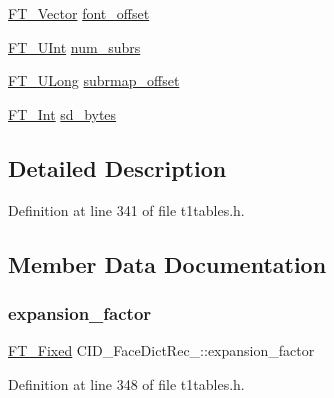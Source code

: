 \begin{DoxyCompactItemize}
\item 
\mbox{\hyperlink{ftimage_8h_ab158b5a7e422acb1968af95db786d018}{F\+T\+\_\+\+Vector}} \mbox{\hyperlink{struct_c_i_d___face_dict_rec___aa62daa8d45ed4a817f1207cbd452d61e}{font\+\_\+offset}}
\item 
\mbox{\hyperlink{fttypes_8h_abcb8db4dbf35d2b55a9e8c7b0926dc52}{F\+T\+\_\+\+U\+Int}} \mbox{\hyperlink{struct_c_i_d___face_dict_rec___a611c406c8d7cd2e37d077070f4bb3ebe}{num\+\_\+subrs}}
\item 
\mbox{\hyperlink{fttypes_8h_a4fac88bdba78eb76b505efa6e4fbf3f5}{F\+T\+\_\+\+U\+Long}} \mbox{\hyperlink{struct_c_i_d___face_dict_rec___a45d58111727af70018289e7c5b64ba8c}{subrmap\+\_\+offset}}
\item 
\mbox{\hyperlink{fttypes_8h_af90e5fb0d07e21be9fe6faa33f02484c}{F\+T\+\_\+\+Int}} \mbox{\hyperlink{struct_c_i_d___face_dict_rec___aecdf98f9671f22c1715ec929b77767ce}{sd\+\_\+bytes}}
\end{DoxyCompactItemize}


\subsection{Detailed Description}


Definition at line 341 of file t1tables.\+h.



\subsection{Member Data Documentation}
\mbox{\label{struct_c_i_d___face_dict_rec___ae601bb5bc25e9a5f3da8e7c12fef6c92}} 
\subsubsection{\texorpdfstring{expansion\_factor}{expansion\_factor}}
{\footnotesize\ttfamily \mbox{\hyperlink{fttypes_8h_a5f5a679cc09f758efdd0d1c5feed3c3d}{F\+T\+\_\+\+Fixed}} C\+I\+D\+\_\+\+Face\+Dict\+Rec\+\_\+\+::expansion\+\_\+factor}



Definition at line 348 of file t1tables.\+h.

\mbox{\label{struct_c_i_d___face_dict_rec___aa418f6ce40b7574b6234e0ab48377e4b}} 

